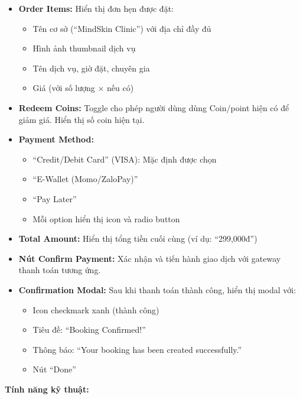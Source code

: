 \begin{itemize}
    \item \textbf{Order Items:} Hiển thị đơn hẹn được đặt:
    \begin{itemize}
        \item Tên cơ sở (``MindSkin Clinic'') với địa chỉ đầy đủ
        \item Hình ảnh thumbnail dịch vụ
        \item Tên dịch vụ, giờ đặt, chuyên gia
        \item Giá (với số lượng × nếu có)
    \end{itemize}
    
    \item \textbf{Redeem Coins:} Toggle cho phép người dùng dùng Coin/point hiện có để giảm giá. Hiển thị số coin hiện tại.
    
    \item \textbf{Payment Method:}
    \begin{itemize}
        \item ``Credit/Debit Card'' (VISA): Mặc định được chọn
        \item ``E-Wallet (Momo/ZaloPay)''
        \item ``Pay Later''
        \item Mỗi option hiển thị icon và radio button
    \end{itemize}
    
    \item \textbf{Total Amount:} Hiển thị tổng tiền cuối cùng (ví dụ: ``299,000đ'')
    
    \item \textbf{Nút Confirm Payment:} Xác nhận và tiến hành giao dịch với gateway thanh toán tương ứng.
    
    \item \textbf{Confirmation Modal:} Sau khi thanh toán thành công, hiển thị modal với:
    \begin{itemize}
        \item Icon checkmark xanh (thành công)
        \item Tiêu đề: ``Booking Confirmed!''
        \item Thông báo: ``Your booking has been created successfully.''
        \item Nút ``Done''
    \end{itemize}
\end{itemize}

\textbf{Tính năng kỹ thuật:}

